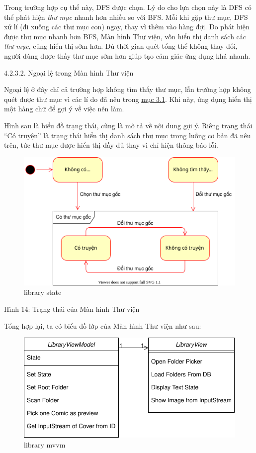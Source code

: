 \documentclass[
]{article}
\begin{document}
Trong trường hợp cụ thể này, DFS được chọn. Lý do cho lựa chọn này là
DFS có thể phát hiện \emph{thư mục} nhanh hơn nhiều so với BFS. Mỗi khi
gặp thư mục, DFS xử lí (đi xuống các thư mục con) ngay, thay vì thêm vào
hàng đợi. Do phát hiện được thư mục nhanh hơn BFS, Màn hình Thư viện,
vốn hiển thị danh sách các \emph{thư mục}, cũng hiển thị sớm hơn. Dù
thời gian quét tổng thể không thay đổi, người dùng được thấy thư mục sớm
hơn giúp tạo cảm giác ứng dụng khá nhanh.

4.2.3.2. Ngoại lệ trong Màn hình Thư viện

Ngoại lệ ở đây chỉ cả trường hợp không tìm thấy thư mục, lẫn trường hợp
không quét được thư mục vì các lí do đã nêu trong
\protect\hyperlink{P3.3.1-scan}{mục 3.1}. Khi này, ứng dụng hiển thị một
hàng chữ để gợi ý về việc nên làm.

Hình sau là biểu đồ trạng thái, cũng là mô tả về nội dung gợi ý. Riêng
trạng thái ``Có truyện'' là trạng thái hiển thị danh sách thư mục trong
luồng cơ bản đã nêu trên, tức thư mục được hiển thị đầy đủ thay vì chỉ
hiện thông báo lỗi.

\begin{figure}
\centering
\includegraphics{../images/library_state.svg}
\caption{library state}
\end{figure}

Hình 14: Trạng thái của Màn hình Thư viện

Tổng hợp lại, ta có biểu đồ lớp của Màn hình Thư viện như sau:

\begin{figure}
\centering
\includegraphics{../images/library_mvvm_class.svg}
\caption{library mvvm}
\end{figure}
\end{document}
